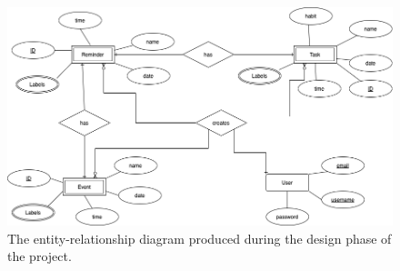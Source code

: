 \begin{figure}[H]

	\centering
	\includegraphics[width=14cm]{./graphics/design/E-R Diagram.png}
	\caption{The entity-relationship diagram produced during the design phase of the project.}
	\label{fig:er_diagram}
	
\end{figure}